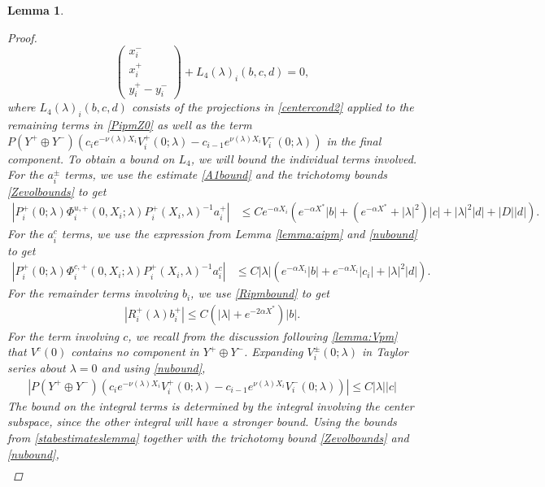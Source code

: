 \documentclass[10pt,reqno]{amsart}
\theoremstyle{plain}
\newtheorem{lemma}[theorem]{Lemma}
\theoremstyle{definition}
\theoremstyle{remark}
\numberwithin{theorem}{section}
\numberwithin{equation}{section}
\begin{document}
\begin{lemma}
\begin{proof}
\begin{equation}\label{projxy}
\begin{pmatrix}x_i^- \\ x_i^+ \\ 
y_i^+ - y_i^- \end{pmatrix} 
+ L_4(\lambda)_i(b, c, d) = 0,
\end{equation}
where $L_4(\lambda)_i(b, c, d)$ consists of the projections in \cref{centercond2} applied to the remaining terms in \cref{PipmZ0} as well as the term $P(Y^+ \oplus Y^-) ( c_i e^{-\nu(\lambda)X_i}V_i^+(0; \lambda) - c_{i-1} e^{\nu(\lambda)X_i} V_i^-(0; \lambda) )$ in the final component. To obtain a bound on $L_4$, we will bound the individual terms involved. For the $a_i^\pm$ terms, we use the estimate \cref{A1bound} and the trichotomy bounds \cref{Zevolbounds} to get
\begin{align*}
|P_i^+(0; \lambda) \Phi_i^{u,+}(0, X_i; \lambda) P_i^+(X_i, \lambda)^{-1} a_i^+| 
&\leq C e^{-\alpha X_i} \left( e^{-\alpha X^*} |b| + (e^{-\alpha X^*} + |\lambda|^2)|c| + |\lambda|^2 |d| + |D||d| \right).
\end{align*}
For the $a_i^c$ terms, we use the expression from Lemma \ref{lemma:aipm} and \cref{nubound} to get
\begin{align*}
| P_i^+(0; \lambda) \Phi_i^{c,+}(0, X_i; \lambda) P_i^+(X_i, \lambda)^{-1} a_i^c | &\leq C |\lambda| \left( e^{-\alpha X_i} |b| + e^{-\alpha X_i} |c_i| +|\lambda|^2 |d| \right).
\end{align*}
For the remainder terms involving $b_i$, we use \cref{Ripmbound} to get
\begin{align*}
|R_i^+(\lambda) b_i^+|\leq C \left(|\lambda| + e^{-2 \alpha X^*}\right)|b|.
\end{align*}
For the term involving $c$, we recall from the discussion following \cref{lemma:Vpm} that $V^c(0)$ contains no component in $Y^+ \oplus Y^-$. Expanding $V_i^\pm(0; \lambda)$ in Taylor series about $\lambda = 0$ and using \cref{nubound},
\begin{align*}
| P(Y^+ \oplus Y^-) ( c_i e^{-\nu(\lambda)X_i}V_i^+(0; \lambda) - c_{i-1} e^{\nu(\lambda)X_i} V_i^-(0; \lambda) ) | \leq C |\lambda| |c|
\end{align*}
The bound on the integral terms is determined by the integral involving the center subspace, since the other integral will have a stronger bound. Using the bounds from \cref{stabestimateslemma} together with the trichotomy bound \cref{Zevolbounds} and \cref{nubound}, 
\begin{align*}

\end{align*}
\end{proof}
\end{lemma}
\end{document}
